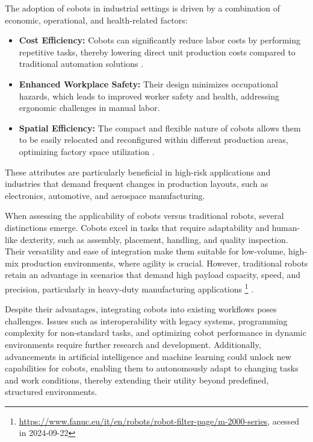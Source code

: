 The adoption of cobots in industrial settings is driven by a combination of economic, operational, and health-related factors:
\begin{itemize}
    \item \textbf{Cost Efficiency:} Cobots can significantly reduce labor costs by performing repetitive tasks, thereby lowering direct unit production costs compared to traditional automation solutions \cite{cobot-2019collaborative}.
    \item \textbf{Enhanced Workplace Safety:} Their design minimizes occupational hazards, which leads to improved worker safety and health, addressing ergonomic challenges in manual labor.
    \item \textbf{Spatial Efficiency:} The compact and flexible nature of cobots allows them to be easily relocated and reconfigured within different production areas, optimizing factory space utilization \cite{cobots-implementation}.
\end{itemize}


These attributes are particularly beneficial in high-risk applications and industries that demand frequent changes in production layouts, such as electronics, automotive, and aerospace manufacturing.

When assessing the applicability of cobots versus traditional robots, several distinctions emerge. Cobots excel in tasks that require adaptability and human-like dexterity, such as assembly, placement, handling, and quality inspection. Their versatility and ease of integration make them suitable for low-volume, high-mix production environments, where agility is crucial. However, traditional robots retain an advantage in scenarios that demand high payload capacity, speed, and precision, particularly in heavy-duty manufacturing applications \footnote{\url{https://www.fanuc.eu/it/en/robots/robot-filter-page/m-2000-series}, acessed in 2024-09-22} \cite{robotics8040100}.


Despite their advantages, integrating cobots into existing workflows poses challenges. Issues such as interoperability with legacy systems, programming complexity for non-standard tasks, and optimizing cobot performance in dynamic environments require further research and development. Additionally, advancements in artificial intelligence and machine learning could unlock new capabilities for cobots, enabling them to autonomously adapt to changing tasks and work conditions, thereby extending their utility beyond predefined, structured environments.


